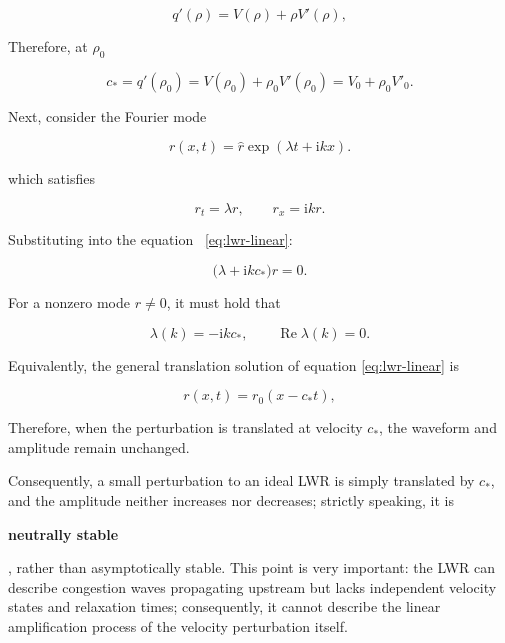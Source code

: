\documentclass[11pt,a4paper,openany]{book}
\numberwithin{equation}{chapter}
\numberwithin{figure}{chapter}
\numberwithin{table}{chapter}
\begin{document}
\begin{equation}
q'(\rho)
=V(\rho)+\rho V'(\rho),
\end{equation}

Therefore, at $\rho_0$


\begin{equation}
\boxed{
c_*=q'(\rho_0)
=V(\rho_0)+\rho_0V'(\rho_0)
=V_0+\rho_0V'_0.}
\label{eq:lwr-cstar-product-detail}
\end{equation}




Next, consider the Fourier mode

\begin{equation}
r(x,t)=\hat r\exp(\lambda t+\mathrm{i}kx).
\end{equation}

which satisfies

\begin{equation}
r_t=\lambda r,\qquad r_x=\mathrm{i}kr.
\end{equation}

Substituting into the equation ~\eqref{eq:lwr-linear}:

\begin{equation}
\bigl(\lambda+\mathrm{i}kc_*\bigr)r=0.
\end{equation}

For a nonzero mode $r\ne0$, it must hold that

\begin{equation}
\lambda(k)=-\mathrm{i}kc_*,
\qquad \operatorname{Re}\lambda(k)=0.
\label{eq:lwr-dispersion}
\end{equation}

Equivalently, the general translation solution of equation \eqref{eq:lwr-linear} is

\begin{equation}
r(x,t)=r_0(x-c_*t),
\end{equation}

Therefore, when the perturbation is translated at velocity $c_*$, the waveform and amplitude remain unchanged.

Consequently, a small perturbation to an ideal LWR is simply translated by $c_*$, and the amplitude neither increases nor decreases; strictly speaking, it is




\textbf{neutrally stable}




, rather than asymptotically stable. This point is very important: the LWR can describe congestion waves propagating upstream but lacks independent velocity states and relaxation times; consequently, it cannot describe the linear amplification process of the velocity perturbation itself.
\end{document}
